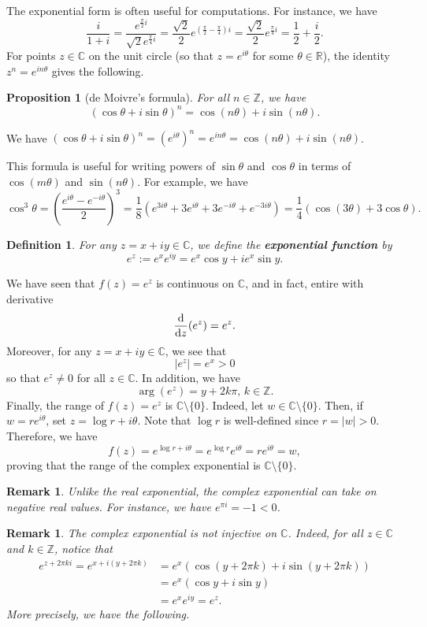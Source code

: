 \documentclass[10pt]{article}
\makeatletter
\newcommand{\R}{\mathbb{R}}
\newcommand{\C}{\mathbb{C}}
\newcommand{\Z}{\mathbb{Z}}
\theoremstyle{newstyle}
\newtheorem{remark}[thm]{Remark}
\newtheorem{prop}[thm]{Proposition}
\newtheorem{defn}[thm]{Definition}
\newenvironment{pf}[1][\proofname]{\par
  \pushQED{\qed}%
  \normalfont \topsep0\p@\relax
  \trivlist
  \item[\hskip\labelsep\scshape
  #1\@addpunct{.}]\ignorespaces
}{%
  \popQED\endtrivlist\@endpefalse
}
\makeatother
\begin{document}
The exponential form is often useful for computations. For instance, we have 
\[ \frac{i}{1+i} = \frac{e^{\frac\pi2i}}{\sqrt2e^{\frac\pi4i}} = \frac{\sqrt2}2 e^{(\frac\pi2 - \frac\pi4)i} = \frac{\sqrt2}2 e^{\frac\pi4i} = \frac12 + \frac{i}2. \]
For points $z \in \C$ on the unit circle (so that $z = e^{i\theta}$ for some 
$\theta \in \R$), the identity $z^n = e^{in\theta}$ gives the following.

\begin{prop}[de Moivre's formula]
For all $n \in \Z$, we have 
\[ (\cos\theta + i\sin\theta)^n = \cos(n\theta) + i\sin(n\theta). \]
\end{prop}
\begin{pf}
We have $(\cos\theta + i\sin\theta)^n = (e^{i\theta})^n = e^{in\theta} = \cos(n\theta) + i\sin(n\theta)$. 
\end{pf}

This formula is useful for writing powers of $\sin\theta$ and $\cos\theta$ in terms of 
$\cos(m\theta)$ and $\sin(n\theta)$. For example, we have 
\[ \cos^3\theta = \left( \frac{e^{i\theta} - e^{-i\theta}}2 \right)^3 
= \frac18 (e^{3i\theta} + 3e^{i\theta} + 3e^{-i\theta} + e^{-3i\theta}) = \frac14 (\cos(3\theta) 
+ 3\cos\theta). \]

\begin{defn}
For any $z = x+iy \in \C$, we define the {\bf exponential function} by 
\[ e^z := e^x e^{iy} = e^x\cos y + ie^x \sin y. \]
\end{defn}
We have seen that $f(z) = e^z$ is continuous on $\C$, and in fact, entire with derivative 
\[ \frac{\rm d}{{\rm d}z}(e^z) = e^z. \]
Moreover, for any $z = x+iy \in \C$, we see that 
\[ |e^z| = e^x > 0 \]
so that $e^z \neq 0$ for all $z \in \C$. In addition, we have 
\[ \arg(e^z) = y + 2k\pi, \, k \in \Z. \]
Finally, the range of $f(z) = e^z$ is $\C \setminus \{0\}$. Indeed, let $w \in \C \setminus \{0\}$. 
Then, if $w = re^{i\theta}$, set $z = \log r + i\theta$. Note that $\log r$ is well-defined since 
$r = |w| > 0$. Therefore, we have 
\[ f(z) = e^{\log r + i\theta} = e^{\log r} e^{i\theta} = re^{i\theta} = w, \]
proving that the range of the complex exponential is $\C \setminus \{0\}$. 

\begin{remark}
Unlike the real exponential, the complex exponential can take on negative real values.
For instance, we have $e^{\pi i} = -1 < 0$. 
\end{remark}

\begin{remark}
The complex exponential is not injective on $\C$. Indeed, for all $z \in \C$ and $k \in \Z$, 
notice that 
\begin{align*}
    e^{z+2\pi ki} = e^{x+i(y+2\pi k)} &= e^x(\cos(y+2\pi k) + i\sin(y + 2\pi k)) \\
    &= e^x(\cos y + i\sin y) \\
    &= e^x e^{iy} = e^z.
\end{align*}
More precisely, we have the following.
\end{remark}
\end{document}
